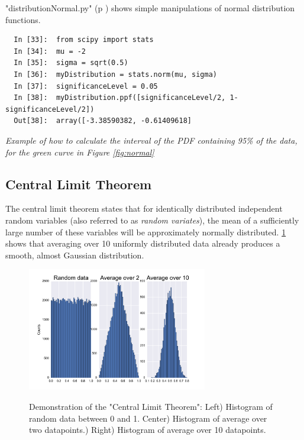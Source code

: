 \PyImg "distributionNormal.py" (p \pageref{py:distributionNormal}) shows simple manipulations of normal distribution functions.

\begin{lstlisting}
  In [33]:  from scipy import stats
  In [34]:  mu = -2
  In [35]:  sigma = sqrt(0.5)
  In [36]:  myDistribution = stats.norm(mu, sigma)
  In [37]:  significanceLevel = 0.05
  In [38]:  myDistribution.ppf([significanceLevel/2, 1-significanceLevel/2])
  Out[38]:  array([-3.38590382, -0.61409618]
\end{lstlisting}
\emph{Example of how to calculate the interval of the PDF containing 95\% of the data, for the green curve in Figure \ref{fig:normal}}

\subsection{Central Limit Theorem}
The central limit theorem states that for identically distributed independent random variables (also referred to as \emph{random variates}), the mean of a sufficiently large number of these variables will be approximately normally distributed.
\ref{fig:CentralLimitTheorem} shows that averaging over 10 uniformly distributed data already produces a smooth, almost Gaussian distribution.

\begin{figure}
  \centering
  \includegraphics[width=0.7\textwidth]{../Images/CentralLimitTheorem.png}\\
  \caption{Demonstration of the "Central Limit Theorem": Left) Histogram of random data between 0 and 1. Center) Histogram of average over two datapoints.) Right) Histogram of average over 10 datapoints.}\label{fig:CentralLimitTheorem}
\end{figure}

